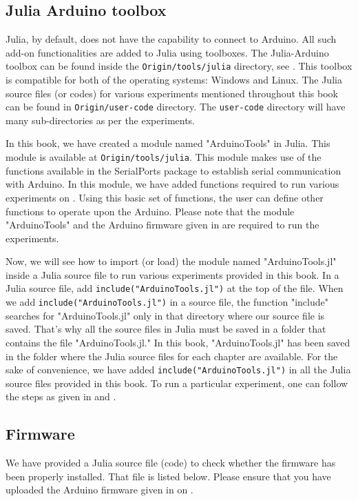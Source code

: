 \subsection{Julia Arduino toolbox}
Julia, by default, does not have the capability to connect to Arduino. 
All such add-on functionalities are added to Julia using toolboxes. 
The Julia-Arduino toolbox can be found inside the {\tt Origin/tools/julia} directory, 
see .  This toolbox is compatible for both of the operating systems: Windows and Linux. 
The Julia source files (or codes) for various experiments mentioned throughout this book can be found in 
{\tt Origin/user-code} directory. The {\tt user-code} directory will have many sub-directories as per the experiments. 

In this book, we have created a module named "ArduinoTools" in Julia.  This module is available at 
{\tt Origin/tools/julia}. This module makes use of the functions available in the SerialPorts package to 
establish serial communication with Arduino. In this module, we have added functions required to run 
various experiments on \arduino. Using this basic set of functions, the user can define other functions to operate
upon the Arduino. Please note that the module "ArduinoTools" and the Arduino firmware  given 
in  are required to run the experiments. 

Now, we will see how to import (or load) the module named "ArduinoTools.jl" inside a Julia source file to run 
various experiments provided in this book. In a Julia source file, add {\tt include("ArduinoTools.jl")} at the top of the file. 
When we add {\tt include("ArduinoTools.jl")} in a source file, the function "include" searches for "ArduinoTools.jl" 
only in that directory where our source file is saved. That's why all the source files in Julia 
must be saved in a folder that contains the file "ArduinoTools.jl." In this book, "ArduinoTools.jl" has been saved 
in the folder where the Julia source files for each chapter are available. For the sake of convenience, we have 
added {\tt include("ArduinoTools.jl")} in all the Julia source files provided in this book. 
To run a particular experiment, one can follow the steps as given in  and . 

\subsection{Firmware}
\lstset{style=mystyle}
\label{sec:test-firmware-julia}
We have provided a Julia source file (code) to check whether the firmware has been
properly installed.  That file is listed below.  Please ensure that 
you have uploaded the Arduino firmware given in  on \arduino.

